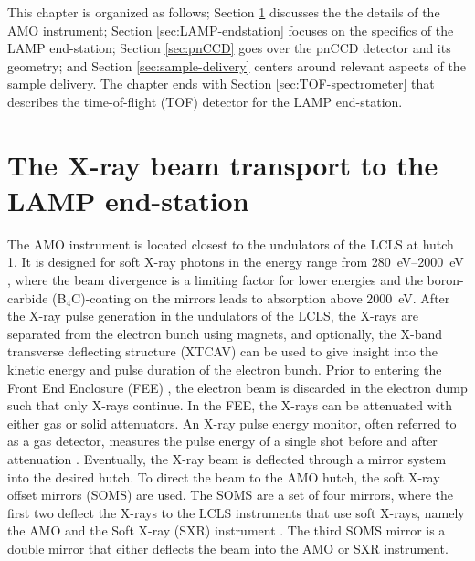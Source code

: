 %
This chapter is organized as follows; Section \ref{sec:amo-instrument} discusses the the details of the AMO instrument; Section \ref{sec:LAMP-endstation} focuses on the specifics of the LAMP end-station; Section \ref{sec:pnCCD} goes over the pnCCD detector and its geometry; and Section \ref{sec:sample-delivery} centers around relevant aspects of the sample delivery. The chapter ends with Section \ref{sec:TOF-spectrometer} that describes the time-of-flight (TOF) detector for the LAMP end-station.
%
%
%
\section{The X-ray beam transport to the LAMP end-station}\label{sec:amo-instrument}
The AMO instrument is located closest to the undulators of the LCLS at hutch 1. It is designed for soft X-ray photons in the energy range from \SIrange{280}{2000}{\electronvolt} \citep{Ferguson-2015-JSR,Bozek-2009-EPJST}, where the beam divergence is a limiting factor for lower energies and the boron-carbide (B$_{4}$C)-coating on the mirrors leads to absorption above \SI{2000}{\electronvolt}. After the X-ray pulse generation in the undulators of the LCLS, the X-rays are separated from the electron bunch using magnets, and optionally, the X-band transverse deflecting structure (XTCAV) \citep{Behrens-2014-NatCom} can be used to give insight into the kinetic energy and pulse duration of the electron bunch. Prior to entering the Front End Enclosure (FEE) \citep{Moeller-2011-NIMPR}, the electron beam is discarded in the electron dump such that only X-rays continue. In the FEE, the X-rays can be attenuated with either gas or solid attenuators. An X-ray pulse energy monitor, often referred to as a gas detector, measures the pulse energy of a single shot before and after attenuation \citep{Hau-Riege-2010-PRL-2}. Eventually, the X-ray beam is deflected through a mirror system into the desired hutch. To direct the beam to the AMO hutch, the soft X-ray offset mirrors (SOMS) are used. The SOMS are a set of four mirrors, where the first two deflect the X-rays to the LCLS instruments that use soft X-rays, namely the AMO and the Soft X-ray (SXR) instrument \citep{Schlotter-2012-RSI,Soufli-2012-AppOpt,Dakovski-2015-JSR}. The third SOMS mirror is a double mirror that either deflects the beam into the AMO or SXR instrument.
